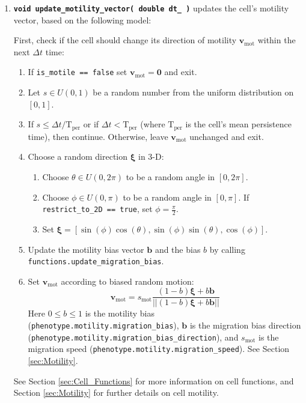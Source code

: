 \documentclass[12pt]{article}
\renewcommand{\vec}[1]{\mathbf{#1}}
\newcommand{\norm}[1]{\left|\left|{#1}\right|\right|}
\newcommand{\beq}{\begin{equation}}
\newcommand{\eeq}{\end{equation}}
\newcommand{\grvec}[1]{\boldsymbol{#1}}
\renewcommand{\v}{\verb}
\newcommand{\smallcode}[1]{\textbf{\texttt{#1}}}
\begin{document}
\begin{enumerate}
\item 
\smallcode{void update\_motility\_vector( double dt\_ )} updates 
the cell's motility vector, based on the following model: 

First, check if the cell should change its direction of 
motility $\vec{v}_\mathrm{mot}$ within the next $\Delta t$ time: 
\begin{enumerate}
\item 
If \v|is_motile == false| set $\vec{v}_\mathrm{mot} = \vec{0}$ and exit. 
\item 
Let 
$s \in U(0,1)$ be a random number from the uniform 
distribution on $[0,1]$. 
\item 
If $s \le \Delta t / \mathrm{T}_\mathrm{per}$ or if 
$\Delta t < \mathrm{T}_\mathrm{per}$ (where $\mathrm{T}_\mathrm{per}$ 
is the cell's mean persistence time), then continue. Otherwise, 
leave $\vec{v}_\mathrm{mot}$ unchanged and exit. 
\item 
Choose a random direction $\grvec{\xi}$ in 3-D: 
\begin{enumerate}
\item 
Choose $\theta \in U(0,2\pi)$ to be a random angle in $[0, 2\pi]$. 
\item 
Choose $\phi \in U(0,\pi)$ to be a random angle in $[0, \pi]$. If 
\v|restrict_to_2D == true|, set $\phi = \frac{\pi}{2}$.   
\item 
Set $\grvec{\xi} = \left[ \sin(\phi)\cos(\theta) , \sin(\phi)\sin(\theta) , \cos(\phi) \right]$. 
\end{enumerate}
\item 
Update the motility bias vector $\vec{b}$ and the bias $b$ 
by calling \hfill\break 
\v|functions.update_migration_bias|. 

\item 
Set $\vec{v}_\mathrm{mot}$ according to biased random motion: 
\beq
\vec{v}_\mathrm{mot} 
= 
s_\mathrm{mot} 
\frac{ 
( 1 - b) \grvec{\xi} + b \vec{b} 
} 
{ 
\norm{ ( 1 - b) \grvec{\xi} + b \vec{b}  }
}
\eeq
Here $0 \le b \le 1$ is the motility bias 
(\v|phenotype.motility.migration_bias|), 
$\vec{b}$ is the migration bias direction 
(\v|phenotype.motility.migration_bias_direction|), and 
$s_\mathrm{mot}$ is the migration speed 
(\v|phenotype.motility.migration_speed|). 
See Section \ref{sec:Motility}. 
\end{enumerate}
See Section \ref{sec:Cell_Functions} for more 
information on cell functions, and 
Section \ref{sec:Motility} for further details on 
cell motility. 



\end{enumerate}
\end{document}
